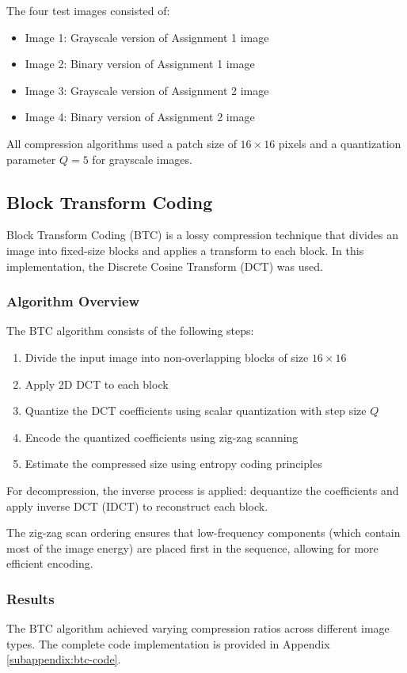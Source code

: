 \documentclass[12pt, a4paper]{AnantDocumentation}
\begin{document}
The four test images consisted of:
\begin{itemize}
	\item Image 1: Grayscale version of Assignment 1 image
	\item Image 2: Binary version of Assignment 1 image  
	\item Image 3: Grayscale version of Assignment 2 image
	\item Image 4: Binary version of Assignment 2 image
\end{itemize}

All compression algorithms used a patch size of $16 \times 16$ pixels and a quantization parameter $Q = 5$ for grayscale images.

\subsection{Block Transform Coding}
\label{subsec:block-transform-coding}
Block Transform Coding (BTC) is a lossy compression technique that divides an image into fixed-size blocks and applies a transform to each block. In this implementation, the Discrete Cosine Transform (DCT) was used.

\subsubsection{Algorithm Overview}
The BTC algorithm consists of the following steps:
\begin{enumerate}
	\item Divide the input image into non-overlapping blocks of size $16 \times 16$
	\item Apply 2D DCT to each block
	\item Quantize the DCT coefficients using scalar quantization with step size $Q$
	\item Encode the quantized coefficients using zig-zag scanning
	\item Estimate the compressed size using entropy coding principles
\end{enumerate}

For decompression, the inverse process is applied: dequantize the coefficients and apply inverse DCT (IDCT) to reconstruct each block.

The zig-zag scan ordering ensures that low-frequency components (which contain most of the image energy) are placed first in the sequence, allowing for more efficient encoding.

\subsubsection{Results}
The BTC algorithm achieved varying compression ratios across different image types. The complete code implementation is provided in Appendix \ref{subappendix:btc-code}.
\end{document}

